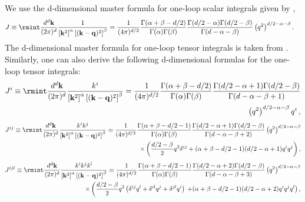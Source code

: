 \endgroup
We use the d-dimensional master formula for one-loop scalar integrals given by ,
\begin{align}
\begin{split}
   & J\equiv\rmint \frac{d^d\bf{k}}{(2\pi)^d}\frac{1}{\left[{\bf{k}}^2\right]^\alpha\left[({\bf{k}-\bf{q}})^2\right]^\beta}=  \frac{1}{(4\pi)^{d/2}}\frac{\Gamma(\alpha+\beta-d/2)}{\Gamma(\alpha)\Gamma(\beta)}\frac{\Gamma(d/2-\alpha)\Gamma(d/2-\beta)}{\Gamma(d-\alpha-\beta)}\left(q^2\right)^{d/2-\alpha-\beta}.\label{ch3:eq:1loop}
    \end{split}
\end{align}
The d-dimensional master formula for one-loop tensor integrals is taken from \cite{Levi:2011eq}. 
Similarly, one can also derive the following d-dimensional formulas for the one-loop tensor integrals: 
\begin{align}
\begin{split}
J^i\equiv\rmint \frac{d^d\bf{k}}{(2\pi)^d}\frac{k^i}{\left[{\bf{k}}^2\right]^\alpha\left[({\bf{k}-\bf{q}})^2\right]^\beta}=\frac{1}{(4\pi)^{d/2}}\frac{\Gamma(\alpha+\beta-d/2)}{\Gamma(\alpha)\Gamma(\beta)}\frac{\Gamma(d/2-\alpha+1)\Gamma(d/2-\beta)}{\Gamma(d-\alpha-\beta+1)}\\ \left(q^2\right)^{d/2-\alpha-\beta}q^i\,,\end{split}
\end{align}
\begin{align}
\begin{split}
J^{ij}\equiv\rmint \frac{d^d\bf{k}}{(2\pi)^d}\frac{k^ik^j}{\left[{\bf{k}}^2\right]^\alpha\left[({\bf{k}-\bf{q}})^2\right]^\beta}=\frac{1}{(4\pi)^{d/2}}\frac{\Gamma(\alpha+\beta-d/2-1)}{\Gamma(\alpha)\Gamma(\beta)}\frac{\Gamma(d/2-\alpha+1)\Gamma(d/2-\beta)}{\Gamma(d-\alpha-\beta+2)}\left(q^2\right)^{d/2-\alpha-\beta}\\
\times\left(\frac{d/2-\beta}{2}q^2\delta^{ij}+(\alpha+\beta-d/2-1)(d/2-\alpha+1)q^iq^j\right),\end{split}
\end{align}
\begin{align}
\begin{split}
J^{ijl}\equiv\rmint \frac{d^d\bf{k}}{(2\pi)^d}\frac{k^ik^jk^l}{\left[{\bf{k}}^2\right]^\alpha\left[({\bf{k}-\bf{q}})^2\right]^\beta}=\frac{1}{(4\pi)^{d/2}}\frac{\Gamma(\alpha+\beta-d/2-1)}{\Gamma(\alpha)\Gamma(\beta)}\frac{\Gamma(d/2-\alpha+2)\Gamma(d/2-\beta)}{\Gamma(d-\alpha-\beta+3)}\left(q^2\right)^{d/2-\alpha-\beta} \\ 
\times\left(\frac{d/2-\beta}{2}q^2\left(\delta^{ij}q^l+\delta^{il}q^j+\delta^{jl}q^i\right)\right.  \left. 
+(\alpha+\beta-d/2-1)(d/2-\alpha+2)q^iq^jq^l\right),
\end{split}
\end{align}


